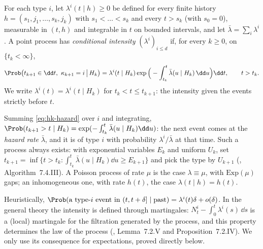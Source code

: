 \begin{definition}\label{def:hk-intensity}
For each type $i$, let $\lambda^i(t\mid h)\ge0$ be defined for every finite history
$h=(s_1,j_1,\dots,s_k,j_k)$ with $s_1<\dots<s_k$ and every $t>s_k$ (with $s_0=0$), measurable in
$(t,h)$ and integrable in $t$ on bounded intervals, and let $\bar\lambda=\sum_i\lambda^i$. A point process
has \emph{conditional intensity} $(\lambda^i)_{i\le d}$ if, for every $k\ge0$, on $\{t_k<\infty\}$,
\begin{equation}\label{eq:hk-hazard}
  \Prob\big(t_{k+1}\in\dd t,\ \kappa_{k+1}=i\,\big|\,H_k\big)
  =\lambda^i(t\mid H_k)\exp\Big(-\int_{t_k}^t\bar\lambda(u\mid H_k)\,\dd u\Big)\dd t,\qquad t>t_k .
\end{equation}
We write $\lambda^i(t)=\lambda^i(t\mid H_{k})$ for $t_k<t\le t_{k+1}$: the intensity given the events strictly
before $t$.
\end{definition}

Summing \eqref{eq:hk-hazard} over $i$ and integrating, $\Prob(t_{k+1}>t\mid H_k)=\exp(-\int_{t_k}^t\bar\lambda(u\mid
H_k)\dd u)$: the next event comes at the \emph{hazard rate} $\bar\lambda$, and it is of type $i$ with probability
$\lambda^i/\bar\lambda$ at that time. Such a process always exists: with \iid exponential variables $E_k$ and
uniform $U_k$, set $t_{k+1}=\inf\{t>t_k:\int_{t_k}^t\bar\lambda(u\mid H_k)\dd u\ge E_{k+1}\}$ and pick the type
by $U_{k+1}$ (\textcite{daley-vere-jones-2003}, Algorithm~7.4.III). A Poisson process of rate $\mu$ is the case
$\lambda\equiv\mu$, with \iid $\mathrm{Exp}(\mu)$ gaps; an inhomogeneous one, with rate $h(t)$, the case
$\lambda(t\mid h)=h(t)$.

\begin{remark}\label{rem:hk-martingale}
Heuristically, $\Prob(\text{a type-}i\text{ event in }(t,t+\delta]\mid\text{past})=\lambda^i(t)\delta+o(\delta)$. In
the general theory the intensity is defined through martingales: $N^i_t-\int_0^t\lambda^i(s)\,\dd s$ is a (local)
martingale for the filtration generated by the process, and this property determines the law of the process
(\textcite{daley-vere-jones-2003}, Lemma~7.2.V and Proposition~7.2.IV). We only use its consequence for
expectations, proved directly below.
\end{remark}

